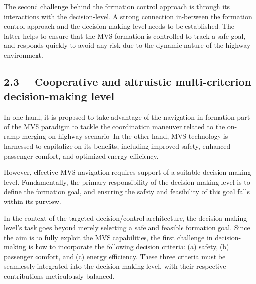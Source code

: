 The second challenge behind the formation control approach is through its interactions with the decision-level. A strong connection in-between the formation control approach and the decision-making level needs to be established. The latter helps to ensure that the MVS formation is controlled to track a safe goal, and responds quickly to avoid any risk due to the dynamic nature of the highway environment. 






\subsection*{2.3 \, \,  Cooperative and altruistic multi-criterion decision-making level}





In one hand, it is proposed to take advantage of the navigation in formation part of the MVS paradigm to tackle the coordination maneuver related to the on-ramp merging on highway scenario. In the other hand, MVS technology is harnessed to capitalize on its benefits, including improved safety, enhanced passenger comfort, and optimized energy efficiency. 


However, effective MVS navigation requires support of a suitable decision-making level. Fundamentally, the primary responsibility of the decision-making level is to define the formation goal, and ensuring the safety and feasibility of this goal falls within its purview. 

In the context of the targeted decision/control architecture, the decision-making level's task goes beyond merely selecting a safe and feasible formation goal. Since the aim is to fully exploit the MVS capabilities, the first challenge in decision-making is how to incorporate the following decision criteria: (a) safety, (b) passenger comfort, and (c) energy efficiency. These three criteria must be seamlessly integrated into the decision-making level, with their respective contributions meticulously balanced. 


